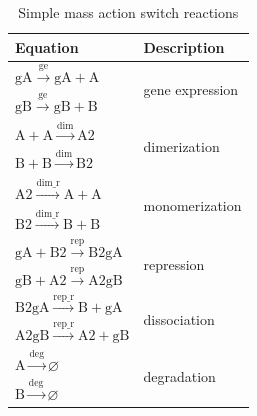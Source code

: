 \begin{table}[tb]
\centering
\caption{Simple mass action switch reactions}
\label{tab:simp-ma-equ}
\begin{tabular}{@{}ll@{}}
\toprule
Equation                                                                             & Description                      \\ \midrule
$\textrm{gA}\stackrel{\textrm{ge}}{\longrightarrow}\textrm{gA} + \textrm{A}$                                             & \multirow{2}{*}{gene expression} \\
$\textrm{gB}\stackrel{\textrm{ge}}{\longrightarrow}\textrm{gB} + \textrm{B}$                                             &                                  \\
$\textrm{A} + \textrm{A} \stackrel{\textrm{dim}}{\longrightarrow}\textrm{A2}$        & \multirow{2}{*}{dimerization}    \\
$\textrm{B} + \textrm{B} \stackrel{\textrm{dim}}{\longrightarrow} \textrm{B2}$       &                                  \\
$\textrm{A2} \stackrel{\textrm{dim\_r}}{\longrightarrow}\textrm{A} + \textrm{A}$     & \multirow{2}{*}{monomerization}  \\
$\textrm{B2} \stackrel{\textrm{dim\_r}}{\longrightarrow}\textrm{B} + \textrm{B}$     &                                  \\
$\textrm{gA} + \textrm{B2} \stackrel{\textrm{rep}}{\longrightarrow}\textrm{B2gA}$    & \multirow{2}{*}{repression}      \\
$\textrm{gB} + \textrm{A2} \stackrel{\textrm{rep}}{\longrightarrow}\textrm{A2gB}$    &                                  \\
$\textrm{B2gA} \stackrel{\textrm{rep\_r}}{\longrightarrow}\textrm{B} + \textrm{gA}$  & \multirow{2}{*}{dissociation}    \\
$\textrm{A2gB} \stackrel{\textrm{rep\_r}}{\longrightarrow}\textrm{A2} + \textrm{gB}$ &                                  \\
$\textrm{A} \stackrel{\textrm{deg}}{\longrightarrow}\varnothing$                     & \multirow{2}{*}{degradation}     \\
$\textrm{B} \stackrel{\textrm{deg}}{\longrightarrow}\varnothing$                     &                                  \\ \cmidrule(r){1-2}
\end{tabular}
\end{table}

